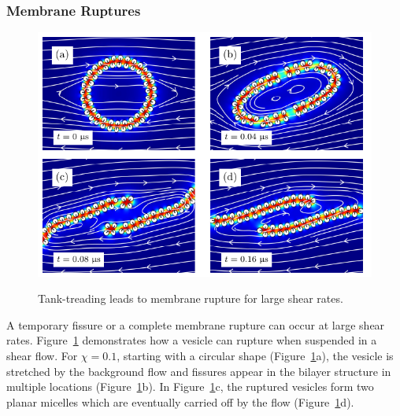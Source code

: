 \documentclass[lineno]{jfm}
\begin{document}
\subsubsection{Membrane Ruptures}
\begin{figure}
\centering
\includegraphics[width=11.32cm]{Figure8_Wrapper.pdf}
\\
  \caption{\label{figure8} Tank-treading leads to membrane rupture for
  large shear rates.} 
\end{figure}
A temporary fissure or a complete membrane rupture can occur at large
shear rates. Figure~\ref{figure8} demonstrates how a vesicle can rupture
when suspended in a shear flow. For $\chi = 0.1$, starting with a
circular shape (Figure~\ref{figure8}a), the vesicle is stretched by the
background flow and fissures appear in the bilayer structure in multiple
locations (Figure~\ref{figure8}b). In Figure~\ref{figure8}c, the
ruptured vesicles form two planar micelles which are eventually carried
off by the flow (Figure~\ref{figure8}d). 
%
\end{document}
